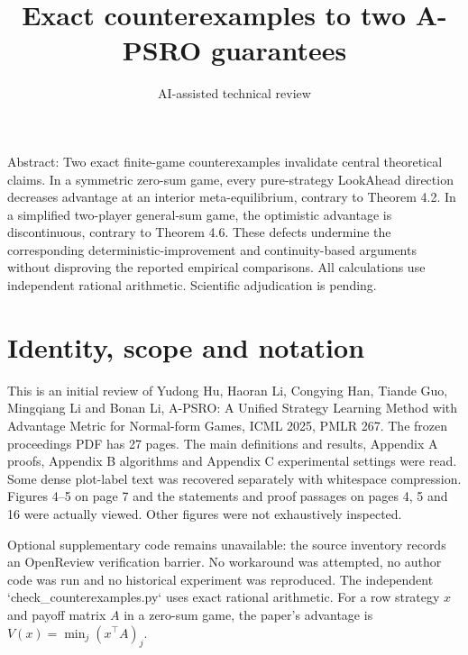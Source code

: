 \documentclass[10pt]{article}
\title{Exact counterexamples to two A-PSRO guarantees}
\author{AI-assisted technical review}
\date{}
\begin{document}
\maketitle
Abstract: Two exact finite-game counterexamples invalidate central theoretical claims. In a symmetric zero-sum game, every pure-strategy LookAhead direction decreases advantage at an interior meta-equilibrium, contrary to Theorem 4.2. In a simplified two-player general-sum game, the optimistic advantage is discontinuous, contrary to Theorem 4.6. These defects undermine the corresponding deterministic-improvement and continuity-based arguments without disproving the reported empirical comparisons. All calculations use independent rational arithmetic. Scientific adjudication is pending.\par
\section*{Identity, scope and notation}
This is an initial review of Yudong Hu, Haoran Li, Congying Han, Tiande Guo, Mingqiang Li and Bonan Li, A-PSRO: A Unified Strategy Learning Method with Advantage Metric for Normal-form Games, ICML 2025, PMLR 267. The frozen proceedings PDF has 27 pages. The main definitions and results, Appendix A proofs, Appendix B algorithms and Appendix C experimental settings were read. Some dense plot-label text was recovered separately with whitespace compression. Figures 4–5 on page 7 and the statements and proof passages on pages 4, 5 and 16 were actually viewed. Other figures were not exhaustively inspected.\par
Optional supplementary code remains unavailable: the source inventory records an OpenReview verification barrier. No workaround was attempted, no author code was run and no historical experiment was reproduced. The independent `check\_counterexamples.py` uses exact rational arithmetic. For a row strategy \(x\) and payoff matrix \(A\) in a zero-sum game, the paper’s advantage is \(V(x)=\min_j(x^\top A)_j\).\par
\end{document}
